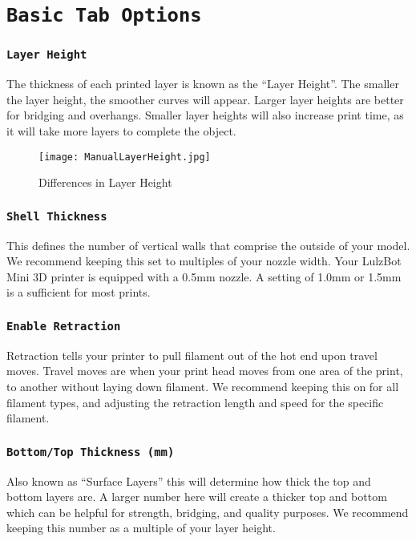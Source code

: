 \section{\texttt{Basic Tab Options}}

\subsubsection{\texttt{Layer Height}}
The thickness of each printed layer is known as the ``Layer Height''. The smaller the layer height, the smoother curves will appear. Larger layer heights are better for bridging and overhangs. Smaller layer heights will also increase print time, as it will take more layers to complete the object.
\begin{figure}[H]
\centering
\texttt{[image: ManualLayerHeight.jpg]}
\caption{Differences in Layer Height}
\label{fig:Differences in Layer Height}
\end{figure}


\subsubsection{\texttt{Shell Thickness}}
This defines the number of vertical walls that comprise the outside of your model. We recommend keeping this set to multiples of your nozzle width. Your LulzBot Mini 3D printer is equipped with a 0.5mm nozzle. A setting of 1.0mm or 1.5mm is a sufficient for most prints.

\subsubsection{\texttt{Enable Retraction}}
Retraction tells your printer to pull filament out of the hot end upon travel moves. Travel moves are when your print head moves from one area of the print, to another without laying down filament. We recommend keeping this on for all filament types, and adjusting the retraction length and speed for the specific filament.

\subsubsection{\texttt{Bottom/Top Thickness (mm)}}
Also known as ``Surface Layers'' this will determine how thick the top and bottom layers are. A larger number here will create a thicker top and bottom which can be helpful for strength, bridging, and quality purposes. We recommend keeping this number as a multiple of your layer height.

